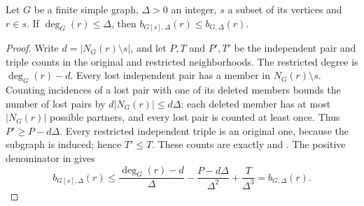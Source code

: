 \begin{lemma}
Let $G$ be a finite simple graph, $\Delta>0$ an integer, $s$ a subset of
its vertices and $r\in s$. If $\deg_G(r)\le\Delta$, then
$b_{G[s],\Delta}(r)\le b_{G,\Delta}(r)$.
\end{lemma}
\begin{proof}
Write $d=|N_G(r)\setminus s|$, and let $P,T$ and $P',T'$ be the independent
pair and triple counts in the original and restricted neighborhoods.
The restricted degree is $\deg_G(r)-d$. Every lost independent pair has
a member in $N_G(r)\setminus s$. Counting incidences of a lost pair with
one of its deleted members bounds the number of lost pairs by
$d|N_G(r)|\le d\Delta$: each deleted member has at most $|N_G(r)|$
possible partners, and every lost pair is counted at least once.
Thus $P'\ge P-d\Delta$. Every restricted independent triple is an original
one, because the subgraph is induced; hence $T'\le T$.
These counts are exactly  and
. The positive denominator in
 gives
\[
b_{G[s],\Delta}(r)\le
\frac{\deg_G(r)-d}{\Delta}-\frac{P-d\Delta}{\Delta^2}
+\frac{T}{\Delta^3}=b_{G,\Delta}(r).
\]
\end{proof}
